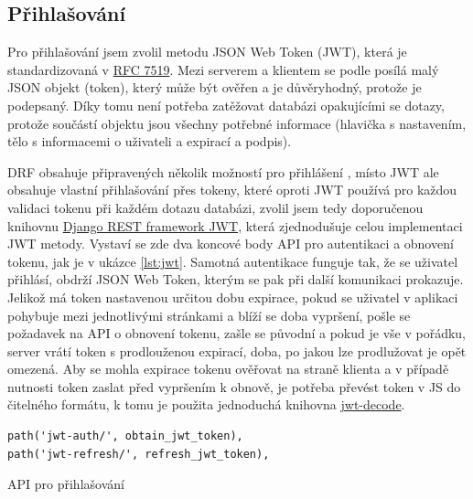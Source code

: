     \subsection{Přihlašování}
    Pro přihlašování jsem zvolil metodu JSON Web Token (JWT), která je standardizovaná v \href{https://tools.ietf.org/html/rfc7519}{RFC 7519}. Mezi serverem a klientem se podle \cite{jwt1} posílá malý JSON objekt (token), který může být ověřen a je důvěryhodný, protože je podepsaný. Díky tomu není potřeba zatěžovat databázi opakujícími se dotazy, protože součástí objektu jsou všechny potřebné informace (hlavička s nastavením, tělo s informacemi o uživateli a expirací a podpis).
    
    DRF obsahuje připravených několik možností pro přihlášení \cite{drf1}, místo JWT ale obsahuje vlastní přihlašování přes tokeny, které oproti JWT používá pro každou validaci tokenu při každém dotazu databázi, zvolil jsem tedy doporučenou knihovnu \href{http://getblimp.github.io/django-rest-framework-jwt/}{Django REST framework JWT}, která zjednodušuje celou implementaci JWT metody. Vystaví se zde dva koncové body API pro autentikaci a obnovení tokenu, jak je v ukázce \ref{lst:jwt}. Samotná autentikace funguje tak, že se uživatel přihlásí, obdrží JSON Web Token, kterým se pak při další komunikaci prokazuje. Jelikož má token nastavenou určitou dobu expirace, pokud se uživatel v aplikaci pohybuje mezi jednotlivými stránkami a blíží se doba vypršení, pošle se požadavek na API o obnovení tokenu, zašle se původní a pokud je vše v pořádku, server vrátí token s prodlouženou expirací, doba, po jakou lze prodlužovat je opět omezená. Aby se mohla expirace tokenu ověřovat na straně klienta a v případě nutnosti token zaslat před vypršením k obnově, je potřeba převést token v JS do čitelného formátu, k tomu je použita jednoduchá knihovna \href{https://github.com/auth0/jwt-decode}{jwt-decode}.
    
    \begin{listing}[ht]
    	\begin{verbatim}
path('jwt-auth/', obtain_jwt_token),
path('jwt-refresh/', refresh_jwt_token),
    	\end{verbatim}
    	\caption{API pro přihlašování}\label{lst:jwt}
    \end{listing}

    
